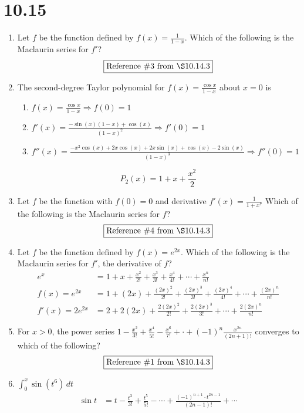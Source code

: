 \documentclass[12pt]{article}
\begin{document}
\section*{10.15}
\begin{enumerate}
	\item Let $f$ be the function defined by $f(x)=\frac{1}{1-x}$. Which of the following is the Maclaurin series for $f'$?
	$$\boxed{\text{Reference } \# 3 \text{ from } \S 10.14.3}$$
	\item The second-degree Taylor polynomial for $f(x)=\frac{\cos x}{1-x}$ about $x=0$ is
		\begin{enumerate}
			\item $f(x) = \frac{\cos x}{1-x} \Longrightarrow f(0) = 1$
			\item $f'(x) = \frac{-\sin\left(x\right)\left(1-x\right)+\cos\left(x\right)}{\left(1-x\right)^{2}} \Longrightarrow f'(0) = 1$
			\item $f''(x) = \frac{-x^{2}\cos\left(x\right)+2x\cos\left(x\right)+2x\sin\left(x\right)+\cos\left(x\right)-2\sin\left(x\right)}{\left(1-x\right)^{3}} \Longrightarrow f''(0) = 1$
		\end{enumerate}
		$$\boxed{P_{2}(x) = 1+x+\frac{x^2}{2}}$$
	\item Let $f$ be the function with $f(0)=0$ and derivative $f'(x)=\frac{1}{1+x^7}$ Which of the following is the Maclaurin series for $f$?
	$$\boxed{\text{Reference } \# 4 \text{ from } \S 10.14.3}$$
	\item Let $f$ be the function defined by $f(x)=e^{2x}$. Which of the following is the Maclaurin series for $f'$, the derivative of $f$?
	\begin{align*}
		e^x 	& = 1+ x + \frac{x^2}{2!} + \frac{x^3}{3!} + \frac{x^4}{4!} + \cdots + \frac{x^n}{n!}               \\
		f(x) = e^{2x} & = 1 + (2x) + \frac{(2x)^2}{2!} + \frac{(2x)^3}{3!} + \frac{(2x)^4}{4!}   + \cdots + \frac{(2x)^n}{n!} \\
		f'(x) = 2e^{2x} &= \boxed{2 + 2(2x) + \frac{2(2x)^2}{2!} + \frac{2(2x)^3}{3!}  + \cdots + \frac{2(2x)^n}{n!}}
	\end{align*}
	\item For $x>0$, the power series $1- \frac{x^2}{3!} + \frac{x^4}{5!} - \frac{x^6}{7!} + \cdot + (-1)^n\frac{x^{2n}}{(2n+1)!}$ converges to which of the following?
	$$\boxed{\text{Reference } \# 1 \text{ from } \S 10.14.3}$$
	\item $\int_{0}^{x} \sin (t^6) \, dt$
		\begin{align*}
			\sin t &= t-\frac{t^3}{3!} + \frac{t^5}{5!} - \cdots + \frac{(-1)^{n+1} \cdot t^{2n-1}}{(2n-1)!} + \cdots \\

\end{align*}
\end{enumerate}
\end{document}
